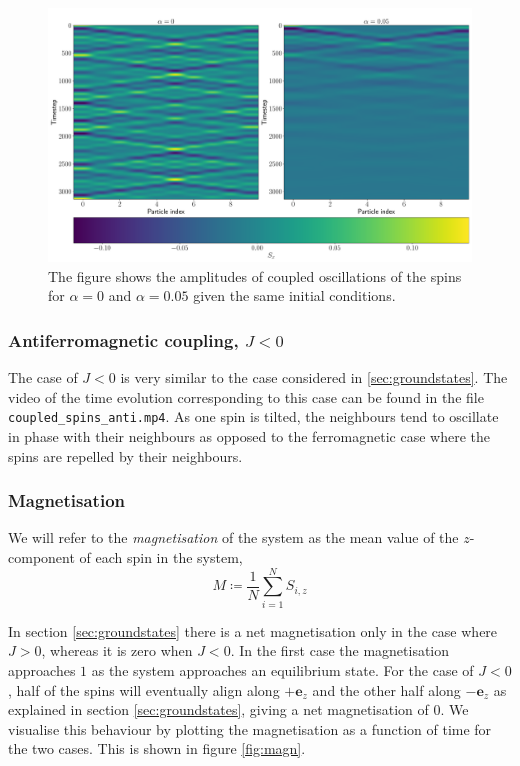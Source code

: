 \begin{figure}[htb]
	\centering
	\includegraphics[width=\columnwidth]{../fig/damped_vs_undamped.pdf}
	\caption{The figure shows the amplitudes of coupled oscillations of the spins for $\alpha = 0$ and $\alpha = 0.05$ given the same initial conditions.}
	\label{fig:damped_heat}
\end{figure}

\subsubsection{Antiferromagnetic coupling, $J<0$}

The case of $J<0$ is very similar to the case considered in \ref{sec:groundstates}. The video of the time evolution corresponding to this case can be found in the file \lstinline|coupled_spins_anti.mp4|. As one spin is tilted, the neighbours tend to oscillate in phase with their neighbours as opposed to the ferromagnetic case where the spins are repelled by their neighbours. 

\subsubsection{Magnetisation}

\begin{definition}
	We will refer to the \textit{magnetisation} of the system as the mean value of the $z$-component of each spin in the system,
	\[
		M \coloneqq \frac{1}{N} \sum_{i=1}^N S_{i,z}
	\]
\end{definition}

In section \ref{sec:groundstates} there is a net magnetisation only in the case where $J>0$, whereas it is zero when $J<0$. In the first case the magnetisation approaches $1$ as the system approaches an equilibrium state. For the case of $J<0$, half of the spins will eventually align along $+\mathbf{e}_z$ and the other half along $-\mathbf{e}_z$ as explained in section \ref{sec:groundstates}, giving a net magnetisation of $0$. We visualise this behaviour by plotting the magnetisation as a function of time for the two cases. This is shown in figure \ref{fig:magn}.

